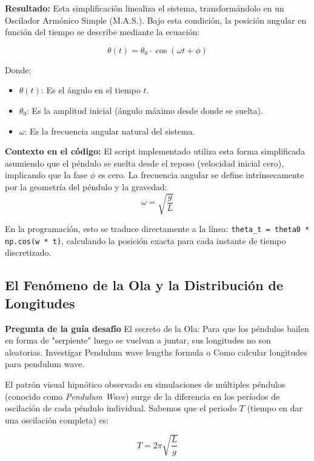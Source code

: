 \documentclass[a4paper,11pt]{article}
\newcommand{\code}[1]{\texttt{\color{blue!60!black}#1}}
\begin{document}
	\textbf{Resultado:} Esta simplificación linealiza el sistema, transformándolo en un Oscilador Armónico Simple (M.A.S.). Bajo esta condición, la posición angular en función del tiempo se describe mediante la ecuación:
	
	\begin{equation}
		\theta(t) = \theta_0 \cdot \cos(\omega t + \phi)
	\end{equation}
	
	Donde:
	\begin{itemize}
		\item $\theta(t)$: Es el ángulo en el tiempo $t$.
		\item $\theta_0$: Es la amplitud inicial (ángulo máximo desde donde se suelta).
		\item $\omega$: Es la frecuencia angular natural del sistema.
	\end{itemize}
	
	\textbf{Contexto en el código:}
	El script implementado utiliza esta forma simplificada asumiendo que el péndulo se suelta desde el reposo (velocidad inicial cero), implicando que la fase $\phi$ es cero. La frecuencia angular se define intrínsecamente por la geometría del péndulo y la gravedad:
	\begin{equation}
		\omega = \sqrt{\frac{g}{L}}
	\end{equation}
	
	En la programación, esto se traduce directamente a la línea: \code{theta\_t = theta0 * np.cos(w * t)}, calculando la posición exacta para cada instante de tiempo discretizado.
	
	\subsection{El Fenómeno de la Ola y la Distribución de Longitudes}
	
	\textbf{Pregunta de la guía desafío} El secreto de la Ola: Para que los péndulos bailen en forma de "serpiente" luego se vuelvan a juntar, sus longitudes no son aleatorias. Investigar Pendulum wave lengths formula o Como calcular longitudes para pendulum wave.
	
	
	El patrón visual hipnótico observado en simulaciones de múltiples péndulos (conocido como \textit{Pendulum Wave}) surge de la diferencia en los períodos de oscilación de cada péndulo individual. Sabemos que el periodo $T$ (tiempo en dar una oscilación completa) es:
	
	\begin{equation}
		T = 2\pi \sqrt{\frac{L}{g}}
	\end{equation}
	
\end{document}
